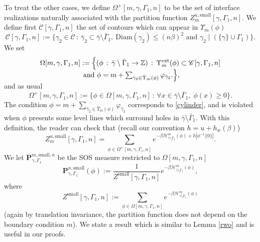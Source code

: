 \documentclass[10pt]{amsart}
\let\mathcal\mathscr
\newcommand{\sep}{\,:\,}
\numberwithin{equation}{section}
\theoremstyle{plain}
\theoremstyle{definition}
\newcommand{\ext}{\mathrm{ext}}
\newcommand{\sm}{\mathrm{small}}
\newcommand{\Diam}{\mathrm{Diam}}
\newcommand{\cH}{{\ensuremath{\mathcal H}} }
\newcommand{\cC}{{\ensuremath{\mathcal C}} }
\newcommand{\bP}{{\ensuremath{\mathbf P}} }
\newcommand{\bbZ}{{\ensuremath{\mathbb Z}} }
\newcommand{\gb}{\beta}
\newcommand{\gG}{\Gamma}
\newcommand{\gO}{\Omega}
\begin{document}
To treat the other cases, we define $\gO^+[m,\gamma,\gG_1,n]$ to be the set of interface realizations naturally associated with the partition function
$Z^{u,\sm}_m[\gamma,\gG_1,n]$.
We define first $\cC[\gamma,\gG_1,n]$ the set of contours which can appear in $\Upsilon_m(\phi)$
\begin{equation*}
\cC[\gamma,\gG_1,n]:=\{ \gamma_2\in \cC \sep \bar \gamma_2\subset \bar \gamma\setminus \bar \gG_1,\ \Diam(\gamma_2)\le (n\gb)^2 \text{ and }
\gamma_2 \mid \left(\{\gamma\} \cup \gG_1\right) \}.
\end{equation*}
We set\vspace*{-7pt}%
\begin{multline*}
\gO[m,\gamma,\gG_1,n]:=\Big\{ (\phi \sep \bar \gamma \setminus \bar \gG_1 \rightarrow \bbZ) \sep \Upsilon^{\ext}_m(\phi)\subset \cC[\gamma,\gG_1,n]
\\[-5pt]
\text{ and } \phi= m+ \textstyle\sum_{\hat \gamma_2 \in \hat \Upsilon_m(\phi)} \varphi_{\hat \gamma_2}. \Big\},\vspace*{-7pt}
\end{multline*}
and as usual
\begin{equation*}
\gO^+[m,\gamma,\gG_1,n]:= \Big\{ \phi\in \gO[m,\gamma,\gG_1,n] \sep \forall x\in \bar \gamma \setminus \bar \gG_1,\; \phi(x)\ge 0 \Big\}.
\end{equation*}
The condition $\phi= m+ \sum_{\hat \gamma_2 \in \hat \Upsilon_m(\phi)} \varphi_{\hat \gamma_2}$ corresponds to \eqref{cylinder}, and is violated when $\phi$ presents some level lines which surround holes in $\bar \gamma \setminus \bar \gG_1$.
With this definition, the reader can check that (recall our convention $h=u+h_w(\gb)$)
\begin{equation}\label{winouze}
Z^{u,\sm}_{m}[\gamma,\Gamma_1,n]= \sum_{\phi \in \gO^+[m,\gamma,\gG_1,n]}e^{-\gb \cH^m_{\bar \gamma \setminus \bar \gG_1}(\phi)+h|\phi^{-1}\{0\}|}.
\end{equation}
We let $\bP^{m,\sm,n}_{\gamma,\gG_1}$ be the SOS measure restricted to $\gO[m,\gamma,\gG_1,n]$
\begin{equation*}
\bP^{n,\sm}_{\gamma,\gG_1}(\phi):=\frac{1}{Z^{\sm}[\gamma,\gG_1,n]}e^{-\gb \cH^m_{\bar \gamma \setminus \bar \gG_1}(\phi)},
\end{equation*}
where
\begin{equation*}
Z^{\sm}[\gamma,\gG_1,n]:= \sum_{\phi \in \gO[m,\gamma,\gG_1,n]} e^{-\gb \cH^m_{\bar \gamma \setminus \bar \gG_1}(\phi)}
\end{equation*}
(again by translation invariance, the partition function does not depend on the boundary condition $m$).
We state a result which is similar to Lemma \ref{rwo} and is useful in our proofs.
\end{document}
